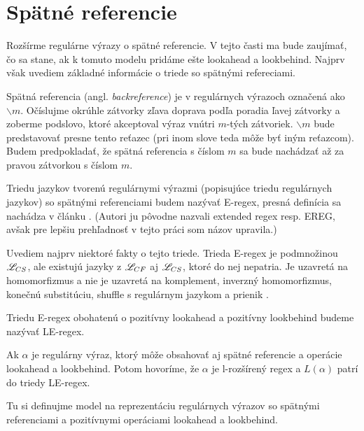 \section{Spätné referencie}\label{chap:backref}

Rozšírme regulárne výrazy o spätné referencie. V tejto časti ma bude zaujímať, čo sa stane, ak k tomuto modelu pridáme ešte lookahead a lookbehind. Najprv však uvediem základné informácie o triede so spätnými refereciami.

Spätná referencia (angl. \textit{backreference}) je v regulárnych výrazoch označená ako $ \backslash m $. Očíslujme okrúhle zátvorky zľava doprava podľa poradia ľavej zátvorky a zoberme podslovo, ktoré akceptoval výraz vnútri $m$-tých zátvoriek. $ \backslash m $ bude predstavovať presne tento reťazec (pri inom slove teda môže byť iným reťazcom). Budem predpokladať, že spätná referencia s číslom $m$ sa bude nachádzať až za pravou zátvorkou s číslom $m$.

Triedu jazykov tvorenú regulárnymi výrazmi (popisujúce triedu regulárnych jazykov) so spätnými referenciami budem nazývať E-regex, presná definícia sa nachádza v článku \cite{ExtendedRegexPower}. (Autori ju pôvodne nazvali extended regex resp. EREG, avšak pre lepšiu prehľadnosť v tejto práci som názov upravila.)

Uvediem najprv niektoré fakty o tejto triede.
Trieda E-regex je podmnožinou $\mathscr{L}_{CS}$, ale existujú jazyky z $\mathscr{L}_{CF}$ aj $\mathscr{L}_{CS}$, ktoré do nej nepatria. Je uzavretá na homomorfizmus a nie je uzavretá na komplement, inverzný homomorfizmus, konečnú substitúciu, shuffle s regulárnym jazykom \cite{ExtendedRegexPower} a prienik \cite{ExtendedRegexIntersec}.

\begin{df}
Triedu E-regex obohatenú o pozitívny lookahead a pozitívny lookbehind budeme nazývať LE-regex.
\end{df}

\begin{df}
Ak $\alpha$ je regulárny výraz, ktorý môže obsahovať aj spätné referencie a operácie lookahead a lookbehind. Potom hovoríme, že $\alpha$ je l-rozšírený regex a $L( \alpha)$ patrí do triedy LE-regex.
\end{df}

Tu si definujme model na reprezentáciu regulárnych výrazov so spätnými referenciami a pozitívnymi operáciami lookahead a lookbehind.

